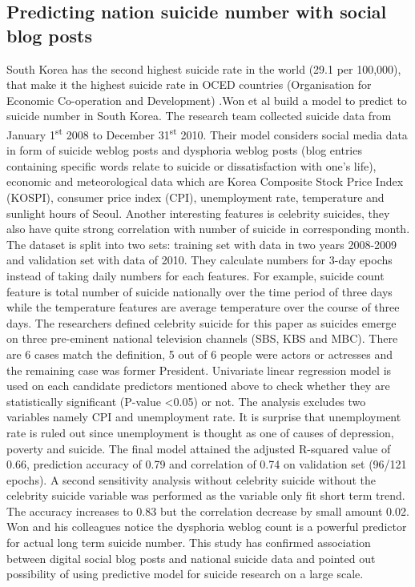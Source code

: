 \subsection{Predicting nation suicide number with social blog posts}
South Korea has the second highest suicide rate in the world (29.1 per 100,000), that make it the highest suicide rate in OCED countries (Organisation for Economic Co-operation and Development) \cite{Yoon2015}.Won et al \cite{Won2013} build a model to predict to suicide number in South Korea. The research team collected suicide data from January 1\textsuperscript{st} 2008 to December 31\textsuperscript{st} 2010. Their model considers social media data in form of suicide weblog posts and dysphoria weblog posts (blog entries containing specific words relate to suicide or dissatisfaction with one’s life), economic and meteorological data which are Korea Composite Stock Price Index (KOSPI), consumer price index (CPI), unemployment rate, temperature and sunlight hours of Seoul. Another interesting features is celebrity suicides, they also have quite strong correlation with number of suicide in corresponding month. The dataset is split into two sets: training set with data in two years 2008-2009 and validation set with data of 2010. They calculate numbers for 3-day epochs instead of taking daily numbers for each features. For example, suicide count feature is total number of suicide nationally over the time period of three days while the temperature features are average temperature over the course of three days. The researchers defined celebrity suicide for this paper as suicides emerge on three pre-eminent national television channels (SBS, KBS and MBC). There are 6 cases match the definition, 5 out of 6 people were actors or actresses and the remaining case was former President. Univariate linear regression model is used on each candidate predictors mentioned above to check whether they are statistically significant (P-value \textless  0.05) or not. The analysis excludes two variables namely CPI and unemployment rate. It is surprise that unemployment rate is ruled out since unemployment is thought as one of causes of depression, poverty and suicide. The final model attained the adjusted R-squared value of 0.66, prediction accuracy of 0.79 and correlation of 0.74 on validation set (96/121 epochs). A second sensitivity analysis without celebrity suicide without the celebrity suicide variable was performed as the variable only fit short term trend. The accuracy increases to 0.83 but the correlation decrease by small amount 0.02. Won and his colleagues notice the dysphoria weblog count is a powerful predictor for actual long term suicide number. This study has confirmed association between digital social blog posts and national suicide data and pointed out possibility of using predictive model for suicide research on a large scale. \\

